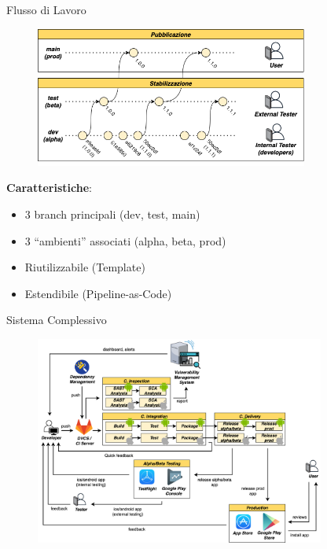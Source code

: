 \begin{frame}{Flusso di Lavoro}
    \begin{figure}[H]
        \includegraphics[width=0.8\textwidth]{img/release-flow.png}
    \end{figure}

    \textbf{Caratteristiche}:
    \begin{itemize}
        \item 3 branch principali (dev, test, main)
        \item 3 ``ambienti'' associati (alpha, beta, prod)
        \item Riutilizzabile (Template)
        \item Estendibile (Pipeline-as-Code)
    \end{itemize}
\end{frame}

\begin{frame}{Sistema Complessivo}

    \begin{figure}[H]
        \includegraphics[width=0.85\textwidth]{img/full-cicd.png}
    \end{figure}

\end{frame}